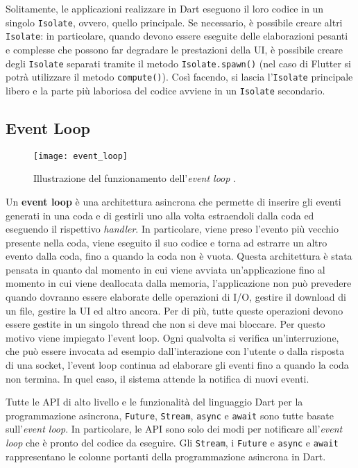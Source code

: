 Solitamente, le applicazioni realizzare in Dart eseguono il loro codice in un singolo \verb|Isolate|, ovvero, quello principale. Se necessario, è possibile creare altri \verb|Isolate|: in particolare, quando devono essere eseguite delle elaborazioni pesanti e complesse che possono far degradare le prestazioni della UI, è possibile creare degli \verb|Isolate| separati tramite il metodo \verb|Isolate.spawn()| (nel caso di Flutter si potrà utilizzare il metodo \verb|compute()|). Così facendo, si lascia l'\verb|Isolate| principale libero e la parte più laboriosa del codice avviene in un \verb|Isolate| secondario.

\subsection{Event Loop}
\label{Event Loop}
\begin{figure}
	\begin{center}
		\texttt{[image: event\_loop]}
		\caption[Event loop]{Illustrazione del funzionamento dell'\textit{event loop} \cite{event_loop}.}
		\label{figura:event_loop}
	\end{center}
\end{figure}

Un \textbf{event loop} \cite{isolate_event_loop_youtube} è una architettura asincrona che permette di inserire gli eventi generati in una coda e di gestirli uno alla volta estraendoli dalla coda ed eseguendo il rispettivo \textit{handler}. In particolare, viene preso l'evento più vecchio presente nella coda, viene eseguito il suo codice e torna ad estrarre un altro evento dalla coda, fino a quando la coda non è vuota. Questa architettura è stata pensata in quanto dal momento in cui viene avviata un'applicazione fino al momento in cui viene deallocata dalla memoria, l'applicazione non può prevedere quando dovranno essere elaborate delle operazioni di I/O, gestire il download di un file, gestire la UI ed altro ancora. Per di più, tutte queste operazioni devono essere gestite in un singolo thread che non si deve mai bloccare. Per questo motivo viene impiegato l'event loop. Ogni qualvolta si verifica un'interruzione, che può essere invocata ad esempio dall’interazione con l’utente o dalla risposta di una socket, l’event loop continua ad elaborare gli eventi fino a quando la coda non termina. In quel caso, il sistema attende la notifica di nuovi eventi. 

Tutte le API di alto livello e le funzionalità del linguaggio Dart per la programmazione asincrona, \verb|Future|, \verb|Stream|, \verb|async| e \verb|await| sono tutte basate sull'\textit{event loop}. In particolare, le API sono solo dei modi per notificare all'\textit{event loop} che è pronto del codice da eseguire. Gli \verb|Stream|, i \verb|Future| e \verb|async| e \verb|await| rappresentano le colonne portanti della programmazione asincrona in Dart.

